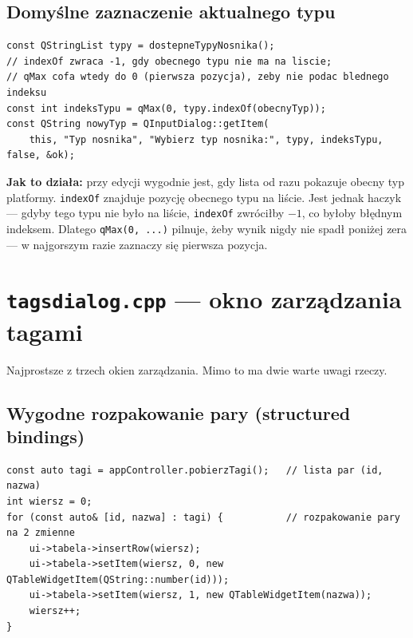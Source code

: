 \documentclass[11pt,a4paper]{article}
\begin{document}
\subsection{Domyślne zaznaczenie aktualnego typu}

\begin{lstlisting}[caption={Lista otwiera się na obecnej wartości}]
const QStringList typy = dostepneTypyNosnika();
// indexOf zwraca -1, gdy obecnego typu nie ma na liscie;
// qMax cofa wtedy do 0 (pierwsza pozycja), zeby nie podac blednego indeksu
const int indeksTypu = qMax(0, typy.indexOf(obecnyTyp));
const QString nowyTyp = QInputDialog::getItem(
    this, "Typ nosnika", "Wybierz typ nosnika:", typy, indeksTypu, false, &ok);
\end{lstlisting}

\textbf{Jak to działa:} przy edycji wygodnie jest, gdy lista od razu pokazuje
obecny typ platformy. \texttt{indexOf} znajduje pozycję obecnego typu na liście.
Jest jednak haczyk --- gdyby tego typu nie było na liście, \texttt{indexOf}
zwróciłby $-1$, co byłoby błędnym indeksem. Dlatego \texttt{qMax(0, ...)} pilnuje,
żeby wynik nigdy nie spadł poniżej zera --- w najgorszym razie zaznaczy się
pierwsza pozycja.

\section{\texttt{tagsdialog.cpp} --- okno zarządzania tagami}

Najprostsze z trzech okien zarządzania. Mimo to ma dwie warte uwagi rzeczy.

\subsection{Wygodne rozpakowanie pary (structured bindings)}

\begin{lstlisting}[caption={Rozpakowanie pary id--nazwa w pętli}]
const auto tagi = appController.pobierzTagi();   // lista par (id, nazwa)
int wiersz = 0;
for (const auto& [id, nazwa] : tagi) {           // rozpakowanie pary na 2 zmienne
    ui->tabela->insertRow(wiersz);
    ui->tabela->setItem(wiersz, 0, new QTableWidgetItem(QString::number(id)));
    ui->tabela->setItem(wiersz, 1, new QTableWidgetItem(nazwa));
    wiersz++;
}
\end{lstlisting}
\end{document}
